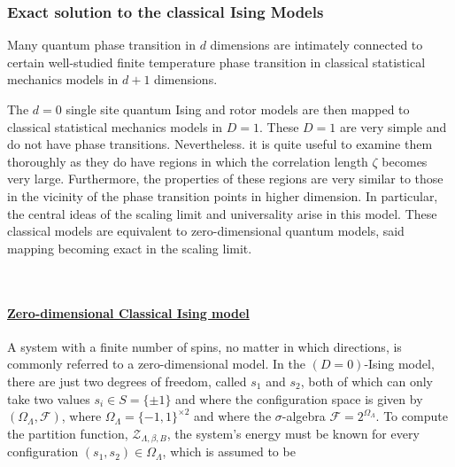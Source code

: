 \documentclass{homework}
\begin{document}

\clearpage

\subsubsection{\textbf{Exact solution to the classical Ising Models}}

Many quantum phase transition in $d$ dimensions are intimately connected to certain well-studied finite temperature phase transition in classical statistical mechanics models in $d+1$ dimensions. \\

\begin{tcolorbox}[colback =yellow, title = Physical Context]

The $d=0$ single site quantum Ising and rotor models are then mapped to classical statistical mechanics models in $D=1$. These $D=1$ are very simple and do not have phase transitions. Nevertheless. it is quite useful to examine them thoroughly as they do have regions in which the correlation length $\zeta$ becomes very large. Furthermore, the properties of these regions are very similar to those in the vicinity of the phase transition points in higher dimension. In particular, the central ideas of the scaling limit and universality arise in this model. These classical models are equivalent to zero-dimensional quantum models, said mapping becoming exact in the scaling limit. 

\end{tcolorbox}

\blanky \\

\paragraph{\underline{Zero-dimensional Classical Ising model}}

A system with a finite number of spins, no matter in which directions, is commonly referred to a zero-dimensional model. In the $(D=0)$-Ising model, there are just two degrees of freedom, called $s_1$ and $s_2$, both of which can only take two values $s_i \in S = \{\pm 1\}$ and where the configuration space is given by $(\Omega_\Lambda, \mathcal{F})$, where $\Omega_\Lambda = \{-1, 1\}^{\times 2}$ and where the $\sigma$-algebra $\mathcal{F} = 2^{\Omega_\Lambda}$. To compute the partition function, $\mathcal{Z}_{\Lambda, \beta, B}$, the system's energy must be known for every configuration $(s_1, s_2) \in \Omega_{\Lambda}$, which is assumed to be 
\end{document}
